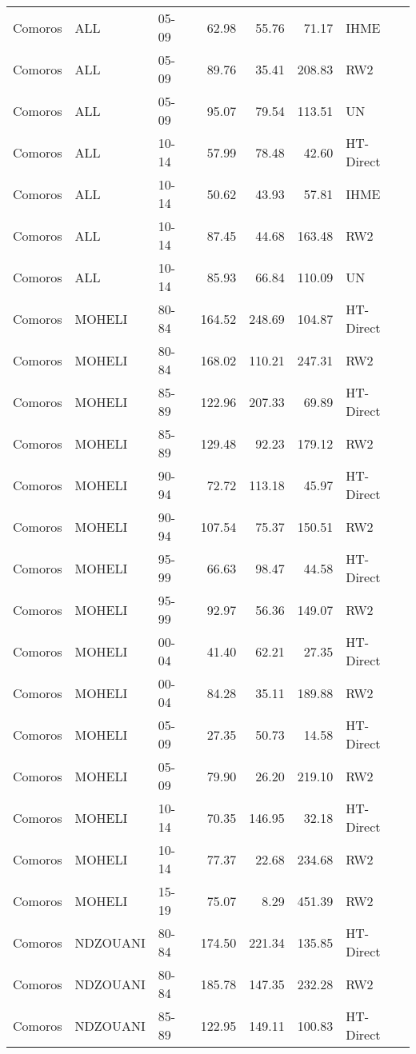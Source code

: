 \begin{longtable}{lllrrrl}
  Comoros & ALL & 05-09 & 62.98 & 55.76 & 71.17 & IHME \\ 
  Comoros & ALL & 05-09 & 89.76 & 35.41 & 208.83 & RW2 \\ 
  Comoros & ALL & 05-09 & 95.07 & 79.54 & 113.51 & UN \\ 
  Comoros & ALL & 10-14 & 57.99 & 78.48 & 42.60 & HT-Direct \\ 
  Comoros & ALL & 10-14 & 50.62 & 43.93 & 57.81 & IHME \\ 
  Comoros & ALL & 10-14 & 87.45 & 44.68 & 163.48 & RW2 \\ 
  Comoros & ALL & 10-14 & 85.93 & 66.84 & 110.09 & UN \\ 
  Comoros & MOHELI & 80-84 & 164.52 & 248.69 & 104.87 & HT-Direct \\ 
  Comoros & MOHELI & 80-84 & 168.02 & 110.21 & 247.31 & RW2 \\ 
  Comoros & MOHELI & 85-89 & 122.96 & 207.33 & 69.89 & HT-Direct \\ 
  Comoros & MOHELI & 85-89 & 129.48 & 92.23 & 179.12 & RW2 \\ 
  Comoros & MOHELI & 90-94 & 72.72 & 113.18 & 45.97 & HT-Direct \\ 
  Comoros & MOHELI & 90-94 & 107.54 & 75.37 & 150.51 & RW2 \\ 
  Comoros & MOHELI & 95-99 & 66.63 & 98.47 & 44.58 & HT-Direct \\ 
  Comoros & MOHELI & 95-99 & 92.97 & 56.36 & 149.07 & RW2 \\ 
  Comoros & MOHELI & 00-04 & 41.40 & 62.21 & 27.35 & HT-Direct \\ 
  Comoros & MOHELI & 00-04 & 84.28 & 35.11 & 189.88 & RW2 \\ 
  Comoros & MOHELI & 05-09 & 27.35 & 50.73 & 14.58 & HT-Direct \\ 
  Comoros & MOHELI & 05-09 & 79.90 & 26.20 & 219.10 & RW2 \\ 
  Comoros & MOHELI & 10-14 & 70.35 & 146.95 & 32.18 & HT-Direct \\ 
  Comoros & MOHELI & 10-14 & 77.37 & 22.68 & 234.68 & RW2 \\ 
  Comoros & MOHELI & 15-19 & 75.07 & 8.29 & 451.39 & RW2 \\ 
  Comoros & NDZOUANI & 80-84 & 174.50 & 221.34 & 135.85 & HT-Direct \\ 
  Comoros & NDZOUANI & 80-84 & 185.78 & 147.35 & 232.28 & RW2 \\ 
  Comoros & NDZOUANI & 85-89 & 122.95 & 149.11 & 100.83 & HT-Direct \\ 

\end{longtable}
